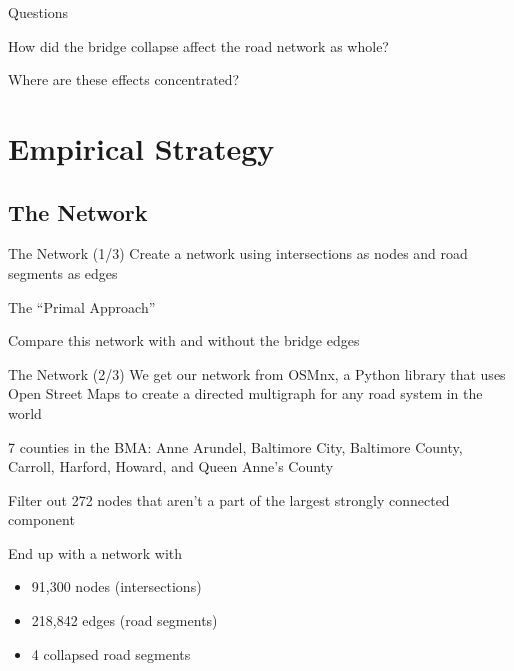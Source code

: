\documentclass{beamer}
\numberwithin{figure}{section} %
\numberwithin{table}{section} %
\begin{document}
\begin{frame}{Questions}
    \begin{center}
        How did the bridge collapse affect the road network as whole?

        Where are these effects concentrated?
    \end{center}
\end{frame}


\section{Empirical Strategy}

\subsection{The Network}

\begin{frame}{The Network (1/3)}
    Create a network using intersections as nodes and road segments as edges

    The ``Primal Approach'' {\tiny \parencite{Porta06}}

    Compare this network with and without the bridge edges
\end{frame}

\begin{frame}{The Network (2/3)}
    We get our network from OSMnx, a Python library that uses Open Street Maps to create a directed multigraph for any road system in the world {\tiny \parencite{Boeing17}}

    7 counties in the BMA: Anne Arundel, Baltimore City, Baltimore County, Carroll, Harford, Howard, and Queen Anne's County

    Filter out 272 nodes that aren't a part of the largest strongly connected component

    End up with a network with
    \begin{itemize}
        \item 91,300 nodes (intersections)
        \item 218,842 edges (road segments)
        \item 4 collapsed road segments
    \end{itemize}
\end{frame}
\end{document}
